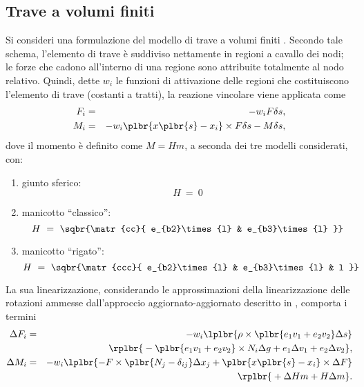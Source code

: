 \documentclass[12pt,dvips,fleqn,italian]{article}
\begin{document}
\subsection*{Trave a volumi finiti}
Si consideri una formulazione del modello di trave a volumi finiti
\cite{FV-AIAA}.
Secondo tale schema, l'elemento di trave \`{e} suddiviso nettamente in
regioni a cavallo dei nodi; le forze che cadono all'interno di una regione
sono attribuite totalmente al nodo relativo.
Quindi, dette $w_i$ le funzioni di attivazione delle regioni che
costituiscono l'elemento di trave (costanti a tratti), la reazione vincolare
viene applicata come
\begin{eqnarray*}
    F_i & = & - w_i F\delta{s} , \\
    M_i & = & - w_i \plbr{ x\plbr{s} - x_i }\times F\delta{s} 
        - M\delta{s} ,
\end{eqnarray*}
dove il momento \`e definito come $ M=Hm$, a seconda dei tre modelli 
considerati, con:
\begin{enumerate}
	\item giunto sferico:
	\begin{displaymath}
		H \ = \ 0
	\end{displaymath}
	\item manicotto ``classico'':
	\begin{displaymath}
		H \ = \ \sqbr{\matr{cc}{
			e_{b2}\times{l} & e_{b3}\times{l}
		}}
	\end{displaymath}
	\item manicotto ``rigato'':
	\begin{displaymath}
		H \ = \ \sqbr{\matr{ccc}{
			e_{b2}\times{l} & e_{b3}\times{l} & l
		}}
	\end{displaymath}
\end{enumerate}
La sua linearizzazione, considerando le approssimazioni della
linearizzazione delle rotazioni ammesse dall'approccio aggiornato-aggiornato
descritto in \cite{PHD-MASARATI}, comporta i termini
\begin{eqnarray*}
    \Delta{F_i} & = & - w_i \lplbr{
        \rho \times \plbr{ e_1 v_1 + e_2 v_2 } \Delta{s}
    } \\
    & & \rplbr{ \mbox{}
	- \plbr{ e_1 v_1 + e_2 v_2 } \times N_i \Delta{g}
	+ e_1 \Delta{v_1} + e_2 \Delta{v_2}
    } , \\
    \Delta{M_i} & = & - w_i \lplbr{
        - F \times \plbr{ N_j - \delta_{ij} }\Delta{ x_j }
	+ \plbr{ x\plbr{s} - x_i }\times \Delta{F}
    } \\
    & & \rplbr{ \mbox{}
        + \Delta{H} m + H \Delta{m}
    } .
\end{eqnarray*}
\end{document}
